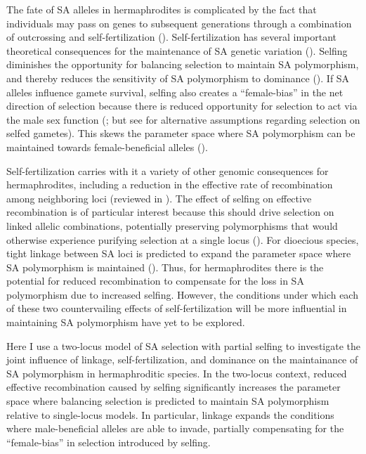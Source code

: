 \documentclass{article}
\begin{document}
The fate of SA alleles in hermaphrodites is complicated by the fact that individuals may pass on genes to subsequent generations through a combination of outcrossing and self-fertilization (\citealt{Goodwillie2005, JarneAuld2006, Igic2005, JordanConn2014}). Self-fertilization has several important theoretical consequences for the maintenance of SA genetic variation (\citealt{JordanConn2014, KimuraOhta1971}). Selfing diminishes the opportunity for balancing selection to maintain SA polymorphism, and thereby reduces the sensitivity of SA polymorphism to dominance (\citealt{JordanConn2014, Tazzyman2015}). If SA alleles influence gamete survival, selfing also creates a ``female-bias'' in the net direction of selection because there is reduced opportunity for selection to act via the male sex function (\citealt{Charlesworth1978, JordanConn2014}; but see \citealt{Tazzyman2015} for alternative assumptions regarding selection on selfed gametes). This skews the parameter space where SA polymorphism can be maintained towards female-beneficial alleles (\citealt{JordanConn2014}). 

Self-fertilization carries with it a variety of other genomic consequences for hermaphrodites, including a reduction in the effective rate of recombination among neighboring loci (reviewed in \citealt{Wright2008}). The effect of selfing on effective recombination is of particular interest because this should drive selection on linked allelic combinations, potentially preserving polymorphisms that would otherwise experience purifying selection at a single locus (\citealt{Fisher1930}). For dioecious species, tight linkage between SA loci is predicted to expand the parameter space where SA polymorphism is maintained (\citealt{Patten2010}). Thus, for hermaphrodites there is the potential for reduced recombination to compensate for the loss in SA polymorphism due to increased selfing. However, the conditions under which each of these two countervailing effects of self-fertilization will be more influential in maintaining SA polymorphism have yet to be explored. 

Here I use a two-locus model of SA selection with partial selfing to investigate the joint influence of linkage, self-fertilization, and dominance on the maintainance of SA polymorphism in hermaphroditic species. In the two-locus context, reduced effective recombination caused by selfing significantly increases the parameter space where balancing selection is predicted to maintain SA polymorphism relative to single-locus models. In particular, linkage expands the conditions where male-beneficial alleles are able to invade, partially compensating for the ``female-bias'' in selection introduced by selfing.
\end{document}
